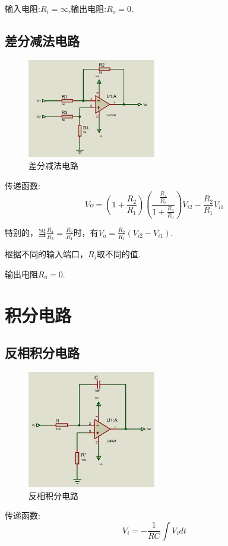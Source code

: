 \documentclass[a4paper,11pt,UTF8]{article}
\begin{document}
输入电阻:$R_i=\infty$,输出电阻:$R_o = 0$.

\subsection{差分减法电路}
\begin{figure}[H]
	\centering
	\includegraphics[width=0.5\textwidth]{差分减法电路}
	\caption{差分减法电路}
\end{figure}
传递函数:
$$Vo = (1+\frac{R_2}{R_1})(\frac{\frac{R_4}{R_3}}{1+\frac{R_4}{R_3}})V_{i2}-\frac{R_2}{R_1}V_{i1}$$

特别的，当$\frac{R_4}{R_3}=\frac{R_2}{R_1}$时，有$V_o=\frac{R_2}{R_1}(V_{i2}-V_{i1})$.

根据不同的输入端口，$R_i$取不同的值.

输出电阻$R_o=0$.

\section{积分电路}
\subsection{反相积分电路}

\begin{figure}[H]
	\centering
	\includegraphics[width=0.5\textwidth]{反相积分电路}
	\caption{反相积分电路}
\end{figure}
传递函数:
$$V_i = -\frac{1}{RC}\int V_i dt$$
\end{document}
